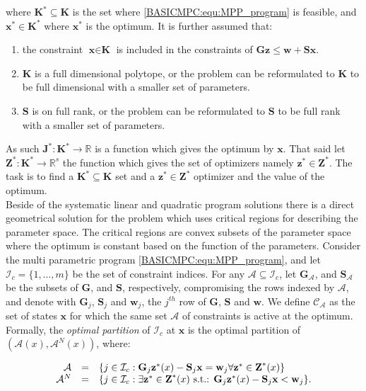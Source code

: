     where $\textbf{K}^*\subseteq\textbf{K}$ is the set where \ref{BASICMPC:equ:MPP_program} is feasible, and $\textbf{x}^*\in\textbf{K}^*$ where $\textbf{x}^*$ is the optimum. It is further assumed that:

    \begin{enumerate}
    \item the constraint $\textbf{x}\in\textbf{K}$ is included in the constraints of $\textbf{Gz}\leq\textbf{w}+\textbf{Sx}$.
    \item $\textbf{K}$ is a full dimensional polytope, or the problem can be reformulated to $\textbf{K}$ to be full dimensional with a smaller set of parameters.
    \item $\textbf{S}$ is on full rank, or the problem can be reformulated to $\textbf{S}$ to be full rank with a smaller set of parameters.
    \end{enumerate}

    As such $\textbf{J}^*:\textbf{K}^*\rightarrow\mathbb{R}$ is a function which gives the optimum by $\textbf{x}$. That said let $\textbf{Z}^*:\textbf{K}^*\rightarrow\mathbb{R}^s$ the function which gives the set of optimizers namely $\textbf{z}^*\in\textbf{Z}^*$. The task is to find a $\textbf{K}^*\subseteq\textbf{K}$ set and a $\textbf{z}^*\in\textbf{Z}^*$ optimizer and the value of the optimum.\\
    Beside of the systematic linear and quadratic program solutions \cite{borrelli2017predictive} there is a direct geometrical solution for the problem which uses critical regions for describing the parameter space. The critical regions are convex subsets of the parameter space where the optimum is constant based on the function of the parameters.
    Consider the multi parametric program \ref{BASICMPC:equ:MPP_program}, and let $\mathcal{I}_c=\{1,\dots,m\}$ be the set of constraint indices. For any $\mathcal{A}\subseteq\mathcal{I}_c$, let $\textbf{G}_{\mathcal{A}}$, and $\textbf{S}_{\mathcal{A}}$ be the subsets of $\textbf{G}$, and $\textbf{S}$, respectively, compromising the rows indexed by $\mathcal{A}$, and denote with $\textbf{G}_j$, $\textbf{S}_j$ and $\textbf{w}_j$, the $j^{th}$ row of $\textbf{G}$, $\textbf{S}$ and $\textbf{w}$. We define $\mathcal{C}_{\mathcal{A}}$ as the set of states $\textbf{x}$ for which the same set $\mathcal{A}$ of constraints is active at the optimum. Formally, the \emph{optimal partition} of $\mathcal{I}_c$ at $\textbf{x}$ is the optimal partition of $(\mathcal{A}(x),\mathcal{A}^N(x))$, where:

    \begin{equation}
    \begin{array}{rcl}
            \mathcal{A}&=&\{j\in\mathcal{I}_c:\textbf{G}_j\textbf{z}^*(x)-\textbf{S}_j\textbf{x}=\textbf{w}_j\forall\textbf{z}^*\in\textbf{Z}^*(x)\}\\
            \mathcal{A}^N&=&\{j\in\mathcal{I}_c:\exists\textbf{z}^*\in\textbf{Z}^*(x)\textnormal{ s.t.: }\textbf{G}_j\textbf{z}^*(x)-\textbf{S}_j\textbf{x}<\textbf{w}_j\}.
        \end{array}
        \label{BASICMPC:equ:MPP_stateset_optimal partition}
    \end{equation}

